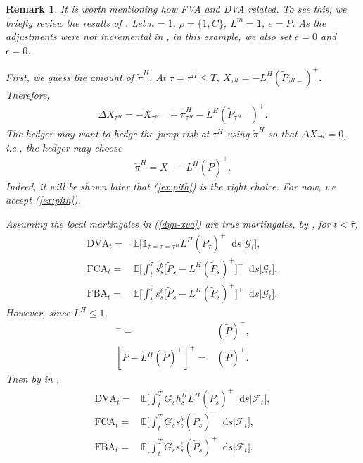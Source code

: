 \documentclass[a4paper, 11pt]{article}              %
\numberwithin{equation}{section}
\theoremstyle{plain}
\newcommand{\btau}{\bar{\tau}}
\newcommand{\1}{\mathds{1}}
\newcommand{\calF}{\mathcal{F}}
\newcommand{\calG}{\mathcal{G}}
\newcommand{\pt}{\tilde{P}}
\newcommand{\pit}{\tilde{\pi}}
\newcommand{\dsE}{\mathbb{E}}
\theoremstyle{plain}
\theoremstyle{definition}
\newtheorem{remark}[thm]{Remark} %
\theoremstyle{plain}
\newtheorem{remark}{Remark}
\newcommand*\df{\mathop{}\!\mathrm{d}}
\begin{document}
\begin{remark}\label{remark:burgard}  
It is worth mentioning how FVA and DVA related. To see this, we briefly review
the results of \cite{burgard2010partial, burgard2011balance}.  Let $n=1$, $\rho =
\{1, C\}$, $L^m=1$, $e=P$. As the adjustments were not incremental in
\cite{burgard2010partial, burgard2011balance}, in this example, we also set 
$e = 0$ and $\epsilon = 0$.
 
First, we guess the amount of
 $\pit^H$. At $\tau = \tau^H \leq T$, $X_{\tau^H} =  - L^H(\pt_{\tau^H-})^+$. Therefore,
 \begin{align}
   \Delta X_{\tau^H} = -X_{\tau^H-}+\pit^H_{\tau^H} - L^H(\pt_{\tau^H-})^+. \nonumber 
 \end{align}
 The hedger may want to hedge the jump risk at $\tau^H$ using $\pit^H$ so that
 $\Delta X_{\tau^H}= 0$, i.e., the hedger may choose
\begin{align}
  \pit^H=X_{-} - L^H(\pt)^+. \label{ex:pith}
\end{align}
Indeed, it will be shown later that (\ref{ex:pith}) is the right choice. For
now, we accept (\ref{ex:pith}).

Assuming the local martingales in (\ref{dyn-xva}) are true martingales, by
, for $t < \btau$,  
\begin{align}
  \text{DVA}_t =& \dsE\bigg[\1_{\btau=\tau = \tau^H }L^H(\pt_{\tau})^+ \df
                  s\bigg|\calG_t\bigg],\nonumber \\  
  \text{FCA}_t =&
                  \dsE\bigg[\int_{t}^{\btau}s^b_s\big[\pt_s-L^H(\pt_s)^+\big]^-\df s
                  \bigg|\calG_t\bigg],\nonumber \\
   \text{FBA}_t =&
                  \dsE\bigg[\int_{t}^{\btau}s^\ell_s\big[\pt_s-L^H(\pt_s)^+\big]^+\df s
                  \bigg|\calG_t\bigg].\nonumber 
\end{align}
However, since $L^H \leq1$,
\begin{align}
 [\pt-L^H(\pt)^+]^- =& (\pt)^-,\nonumber \\
 [\pt-L^H(\pt)^+]^+ =& (\pt)^+.\nonumber 
\end{align}
Then by  in ,
\begin{align}
    \text{DVA}_t =& \dsE\bigg[\int_{t}^{T}G_sh^H_sL^H(\pt_s)^+ \df
                    s\bigg|\calF_t\bigg],\nonumber \\  
  \text{FCA}_t =&
                  \dsE\bigg[\int_{t}^{T}G_ss^b_s(\pt_s)^{-}\df s
                  \bigg|\calF_t\bigg],\nonumber \\
    \text{FBA}_t =&
                  \dsE\bigg[\int_{t}^{T}G_ss^\ell_s(\pt_s)^{+}\df s
                  \bigg|\calF_t\bigg].\nonumber 
\end{align}


\end{remark}
\end{document}
